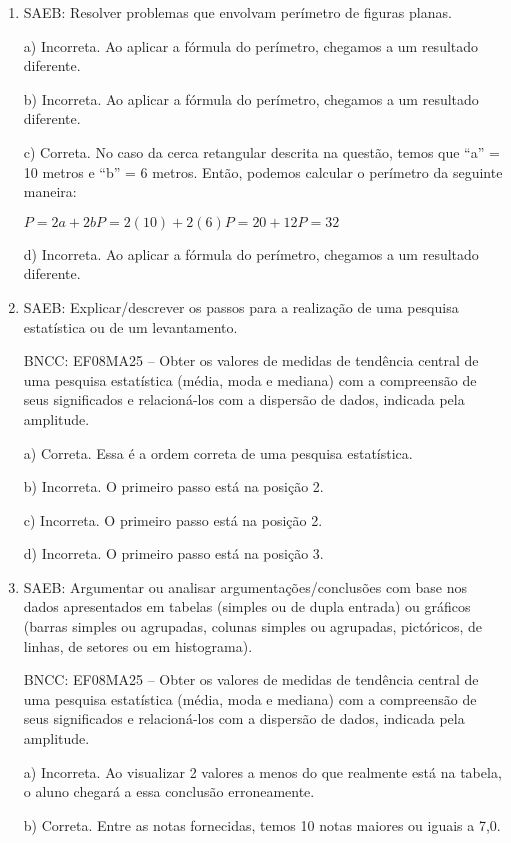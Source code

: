 \begin{enumerate}
\item SAEB: Resolver problemas que envolvam perímetro de figuras planas.

a) Incorreta. Ao aplicar a fórmula do perímetro, chegamos a um
resultado diferente.

b) Incorreta. Ao aplicar a fórmula do perímetro, chegamos a um
resultado diferente.

c) Correta. No caso da cerca retangular descrita na questão, temos
que ``a'' = 10 metros e ``b'' = 6 metros. Então, podemos calcular o
perímetro da seguinte maneira:

$P = 2a + 2b P = 2(10) + 2(6) P = 20 + 12 P = 32$

d) Incorreta. Ao aplicar a fórmula do perímetro, chegamos a um
resultado diferente.

\item SAEB: Explicar/descrever os passos para a realização de uma pesquisa
estatística ou de um levantamento.

BNCC: EF08MA25 -- Obter os valores de medidas de tendência central de
uma pesquisa estatística (média, moda e mediana) com a compreensão de
seus significados e relacioná-los com a dispersão de dados, indicada
pela amplitude.

a) Correta. Essa é a ordem correta de uma pesquisa estatística.

b) Incorreta. O primeiro passo está na posição 2.

c) Incorreta. O primeiro passo está na posição 2.

d) Incorreta. O primeiro passo está na posição 3.

\item SAEB: Argumentar ou analisar argumentações/conclusões com base nos dados
apresentados em tabelas (simples ou de dupla entrada) ou gráficos
(barras simples ou agrupadas, colunas simples ou agrupadas, pictóricos,
de linhas, de setores ou em histograma).

BNCC: EF08MA25 -- Obter os valores de medidas de tendência central de
uma pesquisa estatística (média, moda e mediana) com a compreensão de
seus significados e relacioná-los com a dispersão de dados, indicada
pela amplitude.

a) Incorreta. Ao visualizar 2 valores a menos do que realmente
está na tabela, o aluno chegará a essa conclusão erroneamente.

b) Correta. Entre as notas fornecidas, temos 10 notas maiores ou
iguais a 7,0.


\end{enumerate}

